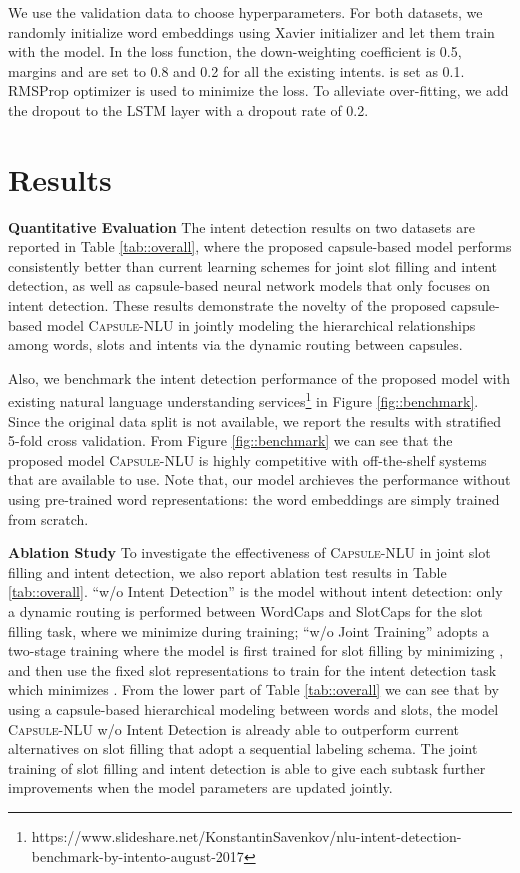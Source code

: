 \documentclass[11pt,a4paper,hyphens]{article}
\newcommand{\ModelName}{{\textsc{Capsule-NLU}}}
\newcommand{\FirstCapsule}{WordCaps}
\newcommand{\SecondCapsule}{SlotCaps}
\begin{document}
We use the validation data to choose hyperparameters.
For both datasets, we randomly initialize word embeddings using Xavier initializer and let them train with the model.
In the loss function, the down-weighting coefficient  is 0.5, margins  and  are set to 0.8 and 0.2 for all the existing intents.  is set as 0.1.
RMSProp optimizer \citep{tieleman2012lecture} is used to minimize the loss.  To alleviate over-fitting, we add the dropout to the LSTM layer with a  dropout rate of 0.2.

\section{Results}
\noindent\textbf{Quantitative Evaluation} The intent detection results on two datasets are reported in Table \ref{tab::overall}, where the proposed capsule-based model performs consistently better than current learning schemes for joint slot filling and intent detection, as well as capsule-based neural network models that only focuses on intent detection. These results demonstrate the novelty of the proposed capsule-based model {\ModelName} in jointly modeling the hierarchical relationships among words, slots and intents via the dynamic routing between capsules.

Also, we benchmark the intent detection performance of the proposed model with existing natural language understanding services\footnote{https://www.slideshare.net/KonstantinSavenkov/nlu-intent-detection-benchmark-by-intento-august-2017} in Figure \ref{fig::benchmark}.
Since the original data split is not available, we report the results with stratified 5-fold cross validation. From Figure \ref{fig::benchmark} we can see that the proposed model {\ModelName} is highly competitive with off-the-shelf systems that are available to use. Note that, our model archieves the performance without using pre-trained word representations: the word embeddings are simply trained from scratch.

\noindent\textbf{Ablation Study}
To investigate the effectiveness of {\ModelName} in joint slot filling and intent detection, we also report ablation test results in Table \ref{tab::overall}. ``w/o Intent Detection'' is the model without intent detection: only a dynamic routing is performed between {\FirstCapsule} and {\SecondCapsule} for the slot filling task, where we minimize  during training; ``w/o Joint Training'' adopts a two-stage training where the model is first trained for slot filling by minimizing , and then use the fixed slot representations to train for the intent detection task which minimizes . From the lower part of Table \ref{tab::overall} we can see that by using a capsule-based hierarchical modeling between words and slots, the model {\ModelName} w/o Intent Detection is already able to outperform current alternatives on slot filling that adopt a sequential labeling schema. The joint training of slot filling and intent detection is able to give each subtask further improvements when the model parameters are updated jointly.
\end{document}
